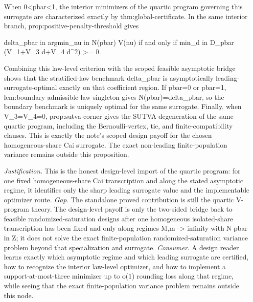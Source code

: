 \documentclass{article}
\begin{document}
When 0<pbar<1, the interior minimizers of the quartic program governing this surrogate are characterized exactly by thm:global-certificate. In the same interior branch, prop:positive-penalty-threshold gives

delta_pbar in argmin_{nu in N(pbar)} V(nu) if and only if min_{d in D_pbar} (V_1+V_3 d+V_4 d^2) >= 0.

Combining this law-level criterion with the scoped feasible asymptotic bridge shows that the stratified-law benchmark delta_pbar is asymptotically leading-surrogate-optimal exactly on that coefficient region. If pbar=0 or pbar=1, lem:boundary-admissible-law-singleton gives N(pbar)={delta_pbar}, so the boundary benchmark is uniquely optimal for the same surrogate. Finally, when V_3=V_4=0, prop:sutva-corner gives the SUTVA degeneration of the same quartic program, including the Bernoulli-vertex, tie, and finite-compatibility clauses. This is exactly the note's scoped design payoff for the chosen homogeneous-share Cai surrogate. The exact non-leading finite-population variance remains outside this proposition.
\par\smallskip\noindent \textit{Justification.} This is the honest design-level import of the quartic program: for one fixed homogeneous-share Cai transcription and along the stated asymptotic regime, it identifies only the sharp leading surrogate value and the implementable optimizer route. \textit{Gap.} The standalone proved contribution is still the quartic V-program theory. The design-level payoff is only the two-sided bridge back to feasible randomized-saturation designs after one homogeneous isolated-share transcription has been fixed and only along regimes M,m -> infinity with N pbar in Z; it does not solve the exact finite-population randomized-saturation variance problem beyond that specialization and surrogate. \textit{Consumer.} A design reader learns exactly which asymptotic regime and which leading surrogate are certified, how to recognize the interior law-level optimizer, and how to implement a support-at-most-three minimizer up to o(1) rounding loss along that regime, while seeing that the exact finite-population variance problem remains outside this node.
\end{document}
